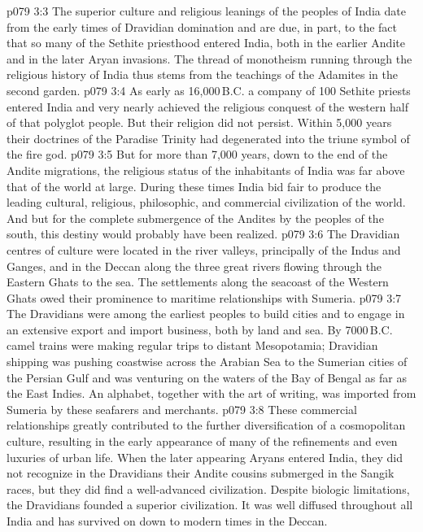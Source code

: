 \vs p079 3:3 \pc The superior culture and religious leanings of the peoples of India date from the early times of Dravidian domination and are due, in part, to the fact that so many of the Sethite priesthood entered India, both in the earlier Andite and in the later Aryan invasions. The thread of monotheism running through the religious history of India thus stems from the teachings of the Adamites in the second garden.
\vs p079 3:4 As early as 16,000\,B.C. a company of 100 Sethite priests entered India and very nearly achieved the religious conquest of the western half of that polyglot people. But their religion did not persist. Within 5,000 years their doctrines of the Paradise Trinity had degenerated into the triune symbol of the fire god.
\vs p079 3:5 But for more than 7,000 years, down to the end of the Andite migrations, the religious status of the inhabitants of India was far above that of the world at large. During these times India bid fair to produce the leading cultural, religious, philosophic, and commercial civilization of the world. And but for the complete submergence of the Andites by the peoples of the south, this destiny would probably have been realized.
\vs p079 3:6 \pc The Dravidian centres of culture were located in the river valleys, principally of the Indus and Ganges, and in the Deccan along the three great rivers flowing through the Eastern Ghats to the sea. The settlements along the seacoast of the Western Ghats owed their prominence to maritime relationships with Sumeria.
\vs p079 3:7 The Dravidians were among the earliest peoples to build cities and to engage in an extensive export and import business, both by land and sea. By 7000\,B.C. camel trains were making regular trips to distant Mesopotamia; Dravidian shipping was pushing coastwise across the Arabian Sea to the Sumerian cities of the Persian Gulf and was venturing on the waters of the Bay of Bengal as far as the East Indies. An alphabet, together with the art of writing, was imported from Sumeria by these seafarers and merchants.
\vs p079 3:8 These commercial relationships greatly contributed to the further diversification of a cosmopolitan culture, resulting in the early appearance of many of the refinements and even luxuries of urban life. When the later appearing Aryans entered India, they did not recognize in the Dravidians their Andite cousins submerged in the Sangik races, but they did find a well\hyp{}advanced civilization. Despite biologic limitations, the Dravidians founded a superior civilization. It was well diffused throughout all India and has survived on down to modern times in the Deccan.

